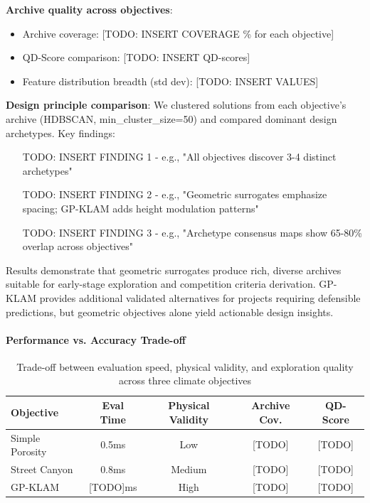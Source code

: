 \documentclass[times,final]{elsarticle}
\begin{document}
\textbf{Archive quality across objectives}:
\begin{itemize}
\item Archive coverage: [TODO: INSERT COVERAGE \% for each objective]
\item QD-Score comparison: [TODO: INSERT QD-scores]
\item Feature distribution breadth (std dev): [TODO: INSERT VALUES]
\end{itemize}

\textbf{Design principle comparison}:
We clustered solutions from each objective's archive (HDBSCAN, min\_cluster\_size=50) and compared dominant design archetypes. Key findings:
\begin{itemize}
\item [TODO: INSERT FINDING 1 - e.g., "All objectives discover 3-4 distinct archetypes"]
\item [TODO: INSERT FINDING 2 - e.g., "Geometric surrogates emphasize spacing; GP-KLAM adds height modulation patterns"]
\item [TODO: INSERT FINDING 3 - e.g., "Archetype consensus maps show 65-80\% overlap across objectives"]
\end{itemize}

Results demonstrate that geometric surrogates produce rich, diverse archives suitable for early-stage exploration and competition criteria derivation. GP-KLAM provides additional validated alternatives for projects requiring defensible predictions, but geometric objectives alone yield actionable design insights.



\paragraph{Performance vs. Accuracy Trade-off}
\begin{table}[h]
\centering
\small
\begin{tabular}{lcccc}
\toprule
Objective & Eval Time & Physical Validity & Archive Cov. & QD-Score \\
\midrule
Simple Porosity & 0.5ms & Low & [TODO] & [TODO] \\
Street Canyon & 0.8ms & Medium & [TODO] & [TODO] \\
GP-KLAM & [TODO]ms & High & [TODO] & [TODO] \\
\bottomrule
\end{tabular}
\caption{Trade-off between evaluation speed, physical validity, and exploration quality across three climate objectives}
\end{table}
\end{document}
